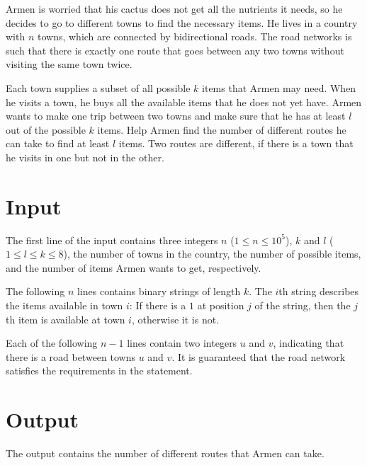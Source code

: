 
Armen is worried that his cactus does not get all the nutrients it needs, so he decides to go to different towns to find the necessary items.
He lives in a country with $n$ towns, which are connected by bidirectional roads.
The road networks is such that there is exactly one route that goes between any two towns without visiting the same town twice.

Each town supplies a subset of all possible $k$ items that Armen may need.
When he visits a town, he buys all the available items that he does not yet have.
Armen wants to make one trip between two towns and make sure that he has at least $l$ out of the possible $k$ items.
Help Armen find the number of different routes he can take to find at least $l$ items.
Two routes are different, if there is a town that he visits in one but not in the other.

\section*{Input}
The first line of the input contains three integers $n$ ($1 \leq n \leq 10^5$), $k$ and $l$ ($1 \leq l \leq k \leq 8$), the number of towns in the country, the number of possible items, and the number of items Armen wants to get, respectively.

The following $n$ lines contains binary strings of length $k$.
The $i$th string describes the items available in town $i$:
If there is a $1$ at position $j$ of the string, then the $j$th item is available at town $i$, otherwise it is not.

Each of the following $n - 1$ lines contain two integers $u$ and $v$, indicating that there is a road between towns $u$ and $v$.
It is guaranteed that the road network satisfies the requirements in the statement.

\section*{Output}
The output contains the number of different routes that Armen can take.

